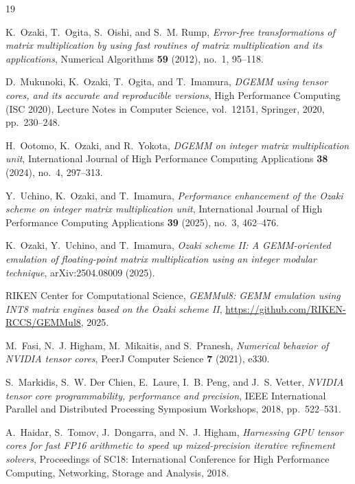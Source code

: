\documentclass[11pt]{amsart}
\theoremstyle{plain}
\theoremstyle{definition}
\begin{document}
\begin{thebibliography}{19}

K.~Ozaki, T.~Ogita, S.~Oishi, and S.~M. Rump,
\emph{Error-free transformations of matrix multiplication by using fast
routines of matrix multiplication and its applications},
Numerical Algorithms \textbf{59} (2012), no.~1, 95--118.

D.~Mukunoki, K.~Ozaki, T.~Ogita, and T.~Imamura,
\emph{DGEMM using tensor cores, and its accurate and reproducible
versions}, High Performance Computing (ISC 2020), Lecture Notes in
Computer Science, vol.~12151, Springer, 2020, pp.~230--248.

H.~Ootomo, K.~Ozaki, and R.~Yokota,
\emph{DGEMM on integer matrix multiplication unit},
International Journal of High Performance Computing Applications
\textbf{38} (2024), no.~4, 297--313.

Y.~Uchino, K.~Ozaki, and T.~Imamura,
\emph{Performance enhancement of the Ozaki scheme on integer matrix
multiplication unit},
International Journal of High Performance Computing Applications
\textbf{39} (2025), no.~3, 462--476.

K.~Ozaki, Y.~Uchino, and T.~Imamura,
\emph{Ozaki scheme II: A GEMM-oriented emulation of floating-point matrix
multiplication using an integer modular technique},
arXiv:2504.08009 (2025).

RIKEN Center for Computational Science,
\emph{GEMMul8: GEMM emulation using INT8 matrix engines based on the
Ozaki scheme II}, \url{https://github.com/RIKEN-RCCS/GEMMul8}, 2025.

M.~Fasi, N.~J. Higham, M.~Mikaitis, and S.~Pranesh,
\emph{Numerical behavior of NVIDIA tensor cores},
PeerJ Computer Science \textbf{7} (2021), e330.

S.~Markidis, S.~W. Der Chien, E.~Laure, I.~B. Peng, and J.~S. Vetter,
\emph{NVIDIA tensor core programmability, performance and precision},
IEEE International Parallel and Distributed Processing Symposium
Workshops, 2018, pp.~522--531.

A.~Haidar, S.~Tomov, J.~Dongarra, and N.~J. Higham,
\emph{Harnessing GPU tensor cores for fast FP16 arithmetic to speed up
mixed-precision iterative refinement solvers},
Proceedings of SC18: International Conference for High Performance
Computing, Networking, Storage and Analysis, 2018.


\end{thebibliography}
\end{document}
